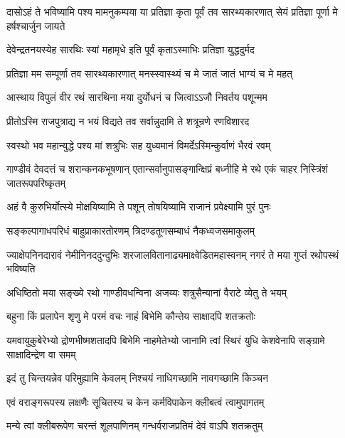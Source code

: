 \onelineshloka
{दासोऽहं ते भविष्यामि पश्य मामनुकम्पया}
\twolineshloka
{या प्रतिज्ञा कृता पूर्वं तव सारथ्यकारणात्}
{सेयं प्रतिज्ञा पूर्णा मे हर्षश्चार्जुन जायते}


\twolineshloka
{देवेन्द्रतनयस्येह सारथिः स्यां महामृधे}
{इति पूर्वं कृताऽस्माभिः प्रतिज्ञा युद्धदुर्मद}


\twolineshloka
{प्रतिज्ञा मम सम्पूर्णा तव सारथ्यकारणात्}
{मनस्स्वास्थ्यं च मे जातं जातं भाग्यं च मे महत्}


\twolineshloka
{आस्थाय विपुलं वीर रथं सारथिना मया}
{दुर्योधनं च जित्वाऽऽजौ निवर्तय पशून्मम}




\twolineshloka
{प्रीतोऽस्मि राजपुत्राद्य न भयं विद्यते तव}
{सर्वान्नुदामि ते शत्रून्रणे रणविशारद}


\twolineshloka
{स्वस्थो भव महान्युद्धे पश्य मां शत्रुभिः सह}
{युध्यमानं विमर्देऽस्मिन्कुर्वाणं भैरवं रवम्}


\threelineshloka
{गाण्डीवं देवदत्तं च शरान्कनकभूषणान्}
{एतान्सर्वानुपासङ्गान्क्षिप्रं बध्नीहि मे रथे}
{एकं चाहर निस्त्रिंशं जातरूपपरिष्कृतम्}


\twolineshloka
{अहं वै कुरुभिर्योत्स्ये मोक्षयिष्यामि ते पशून्}
{तोषयिष्यामि राजानं प्रवेक्ष्यामि पुरं पुनः}


\twolineshloka
{सङ्कल्पागाधपरिधं बाहुप्राकारतोरणम्}
{त्रिदण्डतूणसम्बाधं नैकध्वजसमाकुलम्}


\threelineshloka
{ज्याक्षेपनिनदारावं नेमीनिनददुन्दुभिः}
{शरजालवितानाढ्यमाक्ष्वेडितमहास्वनम्}
{नगरं ते मया गुप्तं रथोपस्थं भविष्यति}


\twolineshloka
{अधिष्ठितो मया सङ्ख्ये रथो गाण्डीवधन्विना}
{अजय्यः शत्रुसैन्यानां वैराटे व्येतु ते भयम्}




\twolineshloka
{बहुना किं प्रलापेन शृणु मे परमं वचः}
{नाहं बिभेमि कौन्तेय साक्षादपि शतक्रतोः}


\threelineshloka
{यमवायुकुबेरेभ्यो द्रोणभीष्मशतादपि}
{बिभेमि नाहमेतेभ्यो जानामि त्वां स्थिरं युधि}
{केशवेनापि सङ्ग्रामे साक्षादिन्द्रेण वा समम्}


\twolineshloka
{इदं तु चिन्तयन्नेव परिमुह्यामि केवलम्}
{निश्चयं नाधिगच्छामि नावगच्छामि किञ्चन}


\twolineshloka
{एवं वराङ्गरूपस्य लक्षणैः सूचितस्य च}
{केन कर्मविपाकेन क्लीबत्वं त्वामुपागतम्}


\twolineshloka
{मन्ये त्वां क्लीबरूपेण चरन्तं शूलपाणिनम्}
{गन्धर्वराजप्रतिमं देवं वाऽपि शतक्रतुम्}

